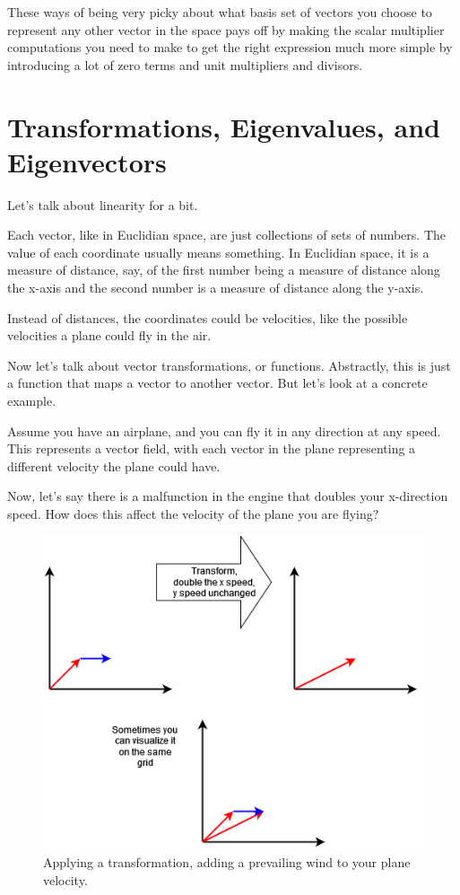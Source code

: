 \documentclass[
]{book}
\begin{document}
These ways of being very picky about what basis set of vectors you choose to represent any other vector in the space pays off by making the scalar multiplier computations you need to make to get the right expression much more simple by introducing a lot of zero terms and unit multipliers and divisors.

\hypertarget{transformations-eigenvalues-and-eigenvectors}{%
\section{Transformations, Eigenvalues, and Eigenvectors}\label{transformations-eigenvalues-and-eigenvectors}}

Let's talk about linearity for a bit.

Each vector, like in Euclidian space, are just collections of sets of numbers. The value of each coordinate usually means something. In Euclidian space, it is a measure of distance, say, of the first number being a measure of distance along the x-axis and the second number is a measure of distance along the y-axis.

Instead of distances, the coordinates could be velocities, like the possible velocities a plane could fly in the air.

Now let's talk about vector transformations, or functions. Abstractly, this is just a function that maps a vector to another vector. But let's look at a concrete example.

Assume you have an airplane, and you can fly it in any direction at any speed. This represents a vector field, with each vector in the plane representing a different velocity the plane could have.

Now, let's say there is a malfunction in the engine that doubles your x-direction speed. How does this affect the velocity of the plane you are flying?

\begin{figure}

{\centering \includegraphics[width=0.75\linewidth,height=0.75\textheight]{images/Eigenvectors-01} 

}

\caption{Applying a transformation, adding a prevailing wind to your plane velocity.}\label{fig:unnamed-chunk-6}
\end{figure}
\end{document}
